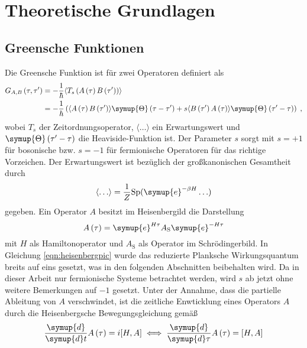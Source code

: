 \chapter{Theoretische Grundlagen}
\label{chap:theoretische_grundlagen}
\section{Greensche Funktionen}
Die Greensche Funktion ist für zwei Operatoren definiert als 
\begin{align}
    G_{A,B} \left (\tau, \tau' \right ) &= - \frac{1}{\hbar} \langle T_s \left ( A \left (\tau \right ) B \left ( \tau' \right ) \right ) \rangle \\
    & = - \frac{1}{\hbar} \left(  \langle A \left (\tau \right ) B \left ( \tau' \right ) \rangle \symup{\Theta} \left ( \tau - \tau' \right) + s 
    \langle B \left ( \tau' \right ) A \left (\tau \right ) \rangle \symup{\Theta} \left ( \tau' - \tau \right)  \right ) \; \text{,} \label{eqn:greensfunction}
\end{align}
wobei $T_s$ der Zeitordnungsoperator, $\langle \ldots \rangle$ ein Erwartungswert und $\symup{\Theta} \left ( \tau' - \tau \right)$ die Heaviside-Funktion ist.\cite{greensfunction}
Der Parameter $s$ sorgt mit $s=+1$ für bosonische bzw. $s=-1$ für fermionische Operatoren für das richtige Vorzeichen.
Der Erwartungswert ist bezüglich der großkanonischen Gesamtheit durch 
\begin{equation*}
    \langle \ldots \rangle = \frac{1}{Z} \text{Sp}(\symup{e}^{-\beta H} \ldots)
\end{equation*}
gegeben.\cite{greensfunction}
Ein Operator $A$ besitzt im Heisenbergild die Darstellung 
\begin{equation}
    A \left ( \tau \right ) = \symup{e}^{H \tau} A_\text{S} \symup{e}^{-H \tau}  \label{eqn:heisenbergpic}
\end{equation}
mit $H$ als Hamiltonoperator und $A_\text{S}$ als Operator im Schrödingerbild. 
In Gleichung \eqref{eqn:heisenbergpic} wurde das reduzierte Planksche Wirkungsquantum breits auf eins gesetzt, was in den folgenden Abschnitten beibehalten wird.
Da in dieser Arbeit nur fermionische Systeme betrachtet werden, wird $s$ ab jetzt ohne weitere Bemerkungen auf $-1$ gesetzt.
Unter der Annahme, dass die partielle Ableitung von $A$ verschwindet, ist die zeitliche Enwticklung eines Operators 
$A$ durch die Heisenbergsche Bewegungsgleichung gemäß 
\begin{equation}
\frac{\symup{d}}{\symup{d}t} A \left (\tau \right ) = i  [H, A] \iff \frac{\symup{d}}{\symup{d}\tau} A \left (\tau \right ) = [H, A] \label{eqn:heisenbergeom}
\end{equation}
